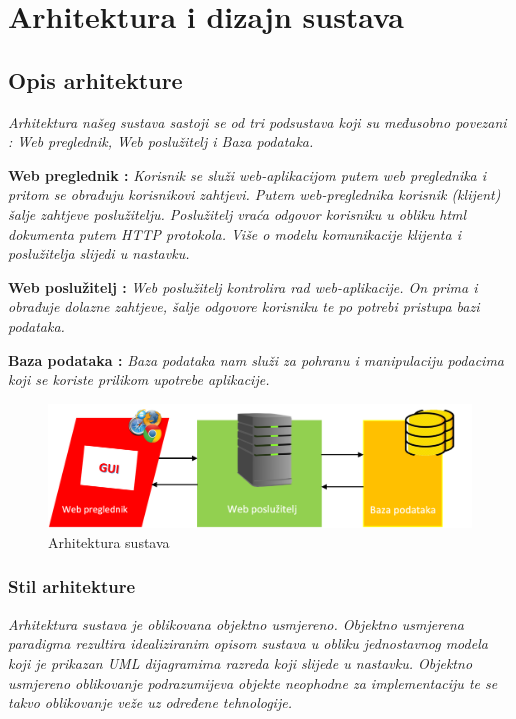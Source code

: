 \chapter{Arhitektura i dizajn sustava}
		

\section{ Opis arhitekture }
\textit{  Arhitektura našeg sustava sastoji se od tri podsustava koji su međusobno povezani : Web preglednik, Web poslužitelj i Baza podataka. }

		\begin{packed_item}
			\item \textbf{Web preglednik : } \textit{ Korisnik se služi web-aplikacijom putem web preglednika i pritom se obrađuju korisnikovi zahtjevi. Putem web-preglednika korisnik (klijent) šalje zahtjeve poslužitelju. Poslužitelj vraća odgovor korisniku u obliku html dokumenta putem HTTP protokola. Više o modelu komunikacije klijenta i poslužitelja slijedi u nastavku.}
			\item \textbf{Web poslužitelj : } \textit{ Web poslužitelj kontrolira rad web-aplikacije. On prima i obrađuje dolazne zahtjeve, šalje odgovore korisniku te po potrebi pristupa bazi podataka. }
			\item \textbf{Baza podataka : } \textit{Baza podataka nam služi za pohranu i manipulaciju podacima koji se koriste prilikom upotrebe aplikacije.}
			\bigskip
		\end{packed_item}
	     
	     	\begin{figure}[H]
	     	\centering
	     	\includegraphics[width=\textwidth]{slike/arh.png}
	     	\caption{Arhitektura sustava}
	     	\label{fig:my_label}
	         \end{figure}
		 
	    \newpage
		\subsection{Stil arhitekture}
		\textit{Arhitektura sustava je oblikovana objektno usmjereno. Objektno usmjerena paradigma rezultira idealiziranim opisom sustava u obliku jednostavnog modela koji je prikazan UML dijagramima razreda koji slijede u nastavku. Objektno usmjereno oblikovanje podrazumijeva objekte neophodne za implementaciju te se takvo oblikovanje veže uz određene tehnologije.}
	
